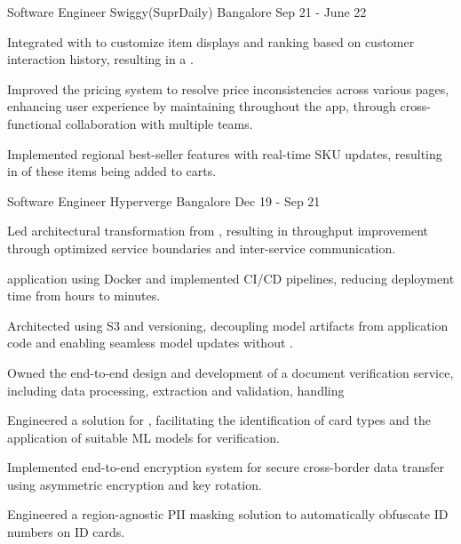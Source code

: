 \begin{cventries}
  \cventry
    {Software Engineer}
    {Swiggy(SuprDaily)}
    {Bangalore}
    {Sep 21 - June 22}
    {
      \begin{cvitems}
        \item {Integrated with  to customize item displays and ranking based on customer interaction history,
          resulting in a .}
        \item {Improved the pricing system to resolve price inconsistencies across various pages,
          enhancing user experience by maintaining  throughout the app, through
          cross-functional collaboration with multiple teams.}
        \item {Implemented regional best-seller features with real-time SKU updates, resulting in  of these items being added to carts.}
      \end{cvitems}
    }
  
  \cventry
    {Software Engineer}
    {Hyperverge}
    {Bangalore}
    {Dec 19  - Sep 21}
    {
      \begin{cvitems}
        \item {Led architectural transformation from , resulting in  throughput improvement
          through optimized service boundaries and inter-service communication.}
          \item { application using Docker and implemented CI/CD pipelines, reducing deployment time from hours to minutes.}
        \item {Architected  using S3 and versioning, 
          decoupling model artifacts from application code and enabling seamless model updates without .}
        \item {Owned the end-to-end design and development of a document verification service, including data processing, extraction and validation, handling }
        \item {Engineered a solution for , facilitating the identification of card types and 
          the application of suitable ML models for verification.}
        \item {Implemented end-to-end encryption system for secure cross-border data transfer using asymmetric encryption and key rotation.}
        \item {Engineered a region-agnostic PII masking solution to automatically obfuscate ID numbers on ID cards.}
      \end{cvitems}
    }

\end{cventries}
